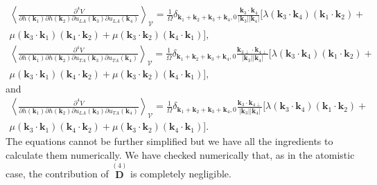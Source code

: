 \begin{multline}
\left\langle\frac{\partial^{4}V}{\partial h(\boldsymbol{k}_{1})\partial h(\boldsymbol{k}_{2})\partial u_{LA}(\boldsymbol{k}_{3})\partial u_{LA}(\boldsymbol{k}_{4})}\right\rangle_{\mathcal{V}}=\frac{1}{\Omega}\delta_{\boldsymbol{
 k}_{1}+\boldsymbol{k}_{2}+\boldsymbol{k}_{3}+\boldsymbol{k}_{4},0}\frac{\boldsymbol{k}_{3}\cdot\boldsymbol{k}_{4}}{|\boldsymbol{k}_{3}||\boldsymbol{k}_{4}|}[\lambda(\boldsymbol{k}_{3}\cdot\boldsymbol{k}_{4})(\boldsymbol{k}_{
 1}\cdot\boldsymbol{k}_{2})+\\\mu(\boldsymbol{k}_{3}\cdot\boldsymbol{k}_{1})(\boldsymbol{k}_{4}\cdot\boldsymbol{k}_{2})+\mu(\boldsymbol{k}_{3}\cdot\boldsymbol{k}_{2})(\boldsymbol{k}_{4}\cdot\boldsymbol{k}_{1})],
\end{multline}
\begin{multline}
 \left\langle\frac{\partial^{4}V}{\partial h(\boldsymbol{k}_{1})\partial h(\boldsymbol{k}_{2})\partial u_{TA}(\boldsymbol{k}_{3})\partial u_{TA}(\boldsymbol{k}_{4})}\right\rangle_{\mathcal{V}}=\frac{1}{\Omega}\delta_{\boldsymbol{
 k}_{1}+\boldsymbol{k}_{2}+\boldsymbol{k}_{3}+\boldsymbol{k}_{4},0}\frac{\boldsymbol{k}_{3\perp}\cdot\boldsymbol{k}_{4\perp}}{|\boldsymbol{k}_{3}||\boldsymbol{k}_{4}|}[\lambda(\boldsymbol{k}_{3}\cdot\boldsymbol{k}_{4})(\boldsymbol{k}_{
 1}\cdot\boldsymbol{k}_{2})+\\\mu(\boldsymbol{k}_{3}\cdot\boldsymbol{k}_{1})(\boldsymbol{k}_{4}\cdot\boldsymbol{k}_{2})+\mu(\boldsymbol{k}_{3}\cdot\boldsymbol{k}_{2})(\boldsymbol{k}_{4}\cdot\boldsymbol{k}_{1})],
\end{multline}
and
\begin{multline}
 \left\langle\frac{\partial^{4}V}{\partial h(\boldsymbol{k}_{1})\partial h(\boldsymbol{k}_{2})\partial u_{LA}(\boldsymbol{k}_{3})\partial u_{TA}(\boldsymbol{k}_{4})}\right\rangle_{\mathcal{V}}=\frac{1}{\Omega}\delta_{\boldsymbol{
 k}_{1}+\boldsymbol{k}_{2}+\boldsymbol{k}_{3}+\boldsymbol{k}_{4},0}\frac{\boldsymbol{k}_{3}\cdot\boldsymbol{k}_{4\perp}}{|\boldsymbol{k}_{3}||\boldsymbol{k}_{4}|}[\lambda(\boldsymbol{k}_{3}\cdot\boldsymbol{k}_{4})(\boldsymbol{k}_{
 1}\cdot\boldsymbol{k}_{2})+\\\mu(\boldsymbol{k}_{3}\cdot\boldsymbol{k}_{1})(\boldsymbol{k}_{4}\cdot\boldsymbol{k}_{2})+\mu(\boldsymbol{k}_{3}\cdot\boldsymbol{k}_{2})(\boldsymbol{k}_{4}\cdot\boldsymbol{k}_{1})].
\end{multline}
The equations cannot be further simplified but we have all the ingredients to calculate them numerically. We have
checked numerically that, as in the atomistic case, the contribution of $\overset{(4)}{\boldsymbol{D}}$ is
completely negligible. \\

